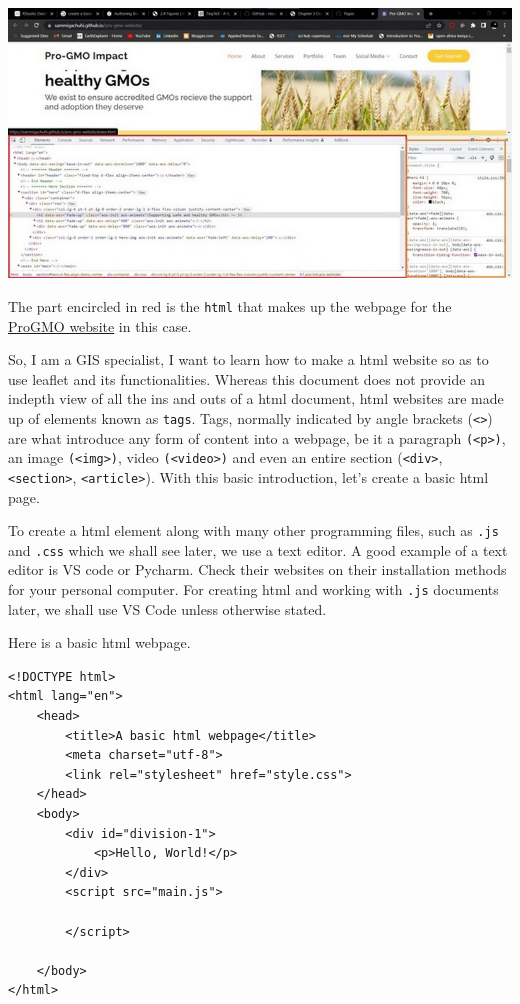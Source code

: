 \documentclass[
]{book}
\begin{document}
\includegraphics[width=11.11in]{../images/elements}

The part encircled in red is the \texttt{html} that makes up the webpage for the \href{https://sammigachuhi.github.io/pro-gmo-website/}{ProGMO website} in this case.

So, I am a GIS specialist, I want to learn how to make a html website so as to use leaflet and its functionalities. Whereas this document does not provide an indepth view of all the ins and outs of a html document, html websites are made up of elements known as \texttt{tags}. Tags, normally indicated by angle brackets (\texttt{\textless{}\textgreater{}}) are what introduce any form of content into a webpage, be it a paragraph \texttt{(\textless{}p\textgreater{})}, an image \texttt{(\textless{}img\textgreater{})}, video \texttt{(\textless{}video\textgreater{})} and even an entire section (\texttt{\textless{}div\textgreater{}}, \texttt{\textless{}section\textgreater{}}, \texttt{\textless{}article\textgreater{}}). With this basic introduction, let's create a basic html page.

To create a html element along with many other programming files, such as \texttt{.js} and \texttt{.css} which we shall see later, we use a text editor. A good example of a text editor is VS code or Pycharm. Check their websites on their installation methods for your personal computer. For creating html and working with \texttt{.js} documents later, we shall use VS Code unless otherwise stated.

Here is a basic html webpage.

\begin{verbatim}
<!DOCTYPE html>
<html lang="en">
    <head>
        <title>A basic html webpage</title>
        <meta charset="utf-8">
        <link rel="stylesheet" href="style.css">
    </head>
    <body>
        <div id="division-1">
            <p>Hello, World!</p>
        </div>
        <script src="main.js">

        </script>

    </body>
</html>
\end{verbatim}
\end{document}
